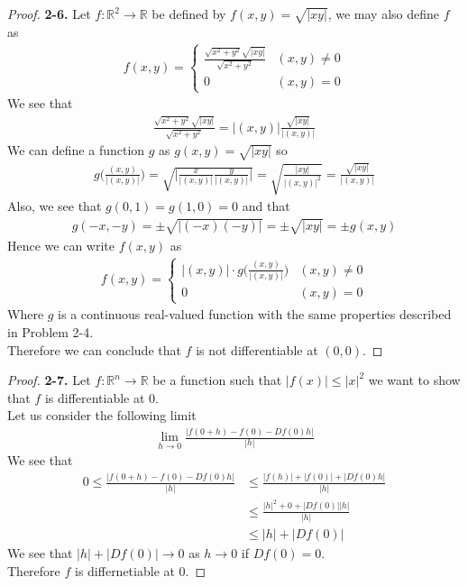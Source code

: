 \documentclass[11pt]{article}
\newcommand{\R}{\mathbb{R}}
\theoremstyle{definition}
\begin{document}
\cleardoublepage
\begin{proof}{\textbf{2-6.}}
Let $f: \R^2 \to \R$ be defined by $f(x,y) = \sqrt{|xy|}$, we may also define
$f$ as
\begin{align*}
    f(x,y) = \begin{cases}
        \frac{\sqrt{x^2 + y^2}\sqrt{|xy|}}{\sqrt{x^2 + y^2}} & (x,y) \neq 0\\
        0 & (x,y) = 0
    \end{cases}
\end{align*}
We see that
\begin{align*}
    \frac{\sqrt{x^2 + y^2}\sqrt{|xy|}}{\sqrt{x^2 + y^2}}
    = |(x,y)| \frac{\sqrt{|xy|}}{|(x,y)|}
\end{align*}
We can define a function $g$ as $g(x,y) = \sqrt{|xy|}$ so
\begin{align*}
    g\bigg(\frac{(x,y)}{|(x,y)|}\bigg)
    = \sqrt{\bigg|\frac{x}{|(x,y)|}\frac{y}{|(x,y)|}\bigg|}
    = \sqrt{\frac{|xy|}{|(x,y)|^2}}
    = \frac{\sqrt{|xy|}}{|(x,y)|}
\end{align*}
Also, we see that $g(0,1) = g(1,0) = 0$ and that
\begin{align*}
    g(-x,-y) = \pm\sqrt{|(-x)(-y)|} = \pm\sqrt{|xy|} = \pm g(x,y)
\end{align*}
Hence we can write $f(x,y)$ as
\begin{align*}
    f(x,y) = \begin{cases}
        |(x,y)|\cdot g\bigg(\frac{(x,y)}{|(x,y)|}\bigg) & (x,y) \neq 0\\
        0 & (x,y) = 0
    \end{cases}
\end{align*}
Where $g$ is a continuous real-valued function with the same properties
described in Problem 2-4.
\\
Therefore we can conclude that $f$ is not differentiable at $(0,0)$.
\end{proof}

\cleardoublepage
\begin{proof}{\textbf{2-7.}}
Let $f:\R^n \to \R$ be a function such that $|f(x)| \leq |x|^2$ we want to show
that $f$ is differentiable at 0.
\\
Let us consider the following limit
\begin{align*}
    \lim_{h \to 0} \frac{|f(0+h) - f(0) - Df(0)h|}{|h|}
\end{align*}
We see that
\begin{align*}
    0 \leq \frac{|f(0+h) - f(0) - Df(0)h|}{|h|}
    &\leq \frac{|f(h)| + |f(0)| + |Df(0)h|}{|h|}\\
    &\leq \frac{|h|^2 + 0 + |Df(0)||h|}{|h|}\\
    &\leq |h| + |Df(0)|
\end{align*}
We see that $|h| + |Df(0)| \to 0$ as $h \to 0$ if $Df(0) = 0$.
\\
Therefore $f$ is differnetiable at 0.
\end{proof}
\end{document}
